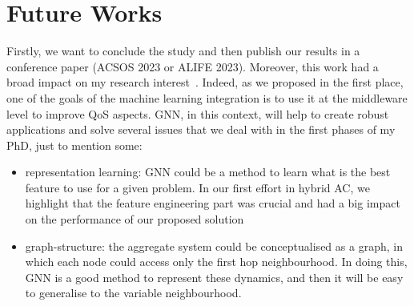 \documentclass{article}
\begin{document}
\section{Future Works}
Firstly, we want to conclude the study and then publish our results in a conference paper (ACSOS 2023 or ALIFE 2023).
Moreover, this work had a broad impact on my research interest~\cite{aguzzi2021research, aguzzi2022addressing, aguzzi2022towards, DBLP:conf/icdcs/AguzziCV22}. 
Indeed, as we proposed in the first place, one of the goals of the machine learning integration is to use it at the middleware level to improve QoS aspects. 
GNN, in this context, will help to create robust applications and solve several issues that we deal with in the first phases of my PhD, just to mention some:
\begin{itemize}
    \item representation learning: GNN could be a method to learn what is the best feature to use for a given problem. In our first effort in hybrid AC, we highlight that the feature engineering part was crucial and had a big impact on the performance of our proposed solution
    \item graph-structure: the aggregate system could be conceptualised as a graph, in which each node could access only the first hop neighbourhood. 
    In doing this, GNN is a good method to represent these dynamics, and then it will be easy to generalise to the variable neighbourhood.
\end{itemize}


\end{document}
